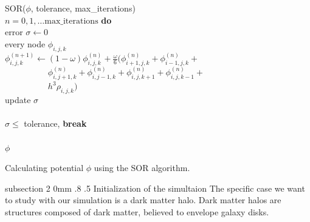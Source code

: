 \documentclass[notitlepage, 12pt]{article}
\makeatletter
\renewcommand{\subsection}{\@startsection    %
        {subsection}
        {2}
        {0mm}
        {.8\baselineskip}
        {.5\baselineskip}
        {\bfseries\normalsize}}
\makeatother
\begin{document}
\begin{algorithm}[H]
\hspace{0.1\textwidth}\parbox{.8\textwidth}{
\-\hspace{0ex}{\bf function} SOR($\phi$, tolerance, max\_iterations)\\
\-\hspace{4ex}{\bf for} $n = 0,1,\ldots\mbox{max\_iterations}$ {\bf do}\\
\-\hspace{8ex}error $\sigma\leftarrow 0$\\
\-\hspace{8ex}{\bf for} every node $\phi_{i,j,k}$\\
\-\hspace{12ex}$\phi_{i,j,k}^{(n+1)} \leftarrow (1-\omega)\phi_{i,j,k}^{(n)} + \frac{\omega}{6} (\phi_{i+1,j,k}^{(n)} +\phi_{i-1,j,k}^{(n)}+$\\
\-\hspace{12ex}$\phantom{\phi_{i,j,k}^{(n+1)} \leftarrow }\phi_{i,j+1,k}^{(n)}+ \phi_{i,j-1,k}^{(n)} + \phi_{i,j,k+1}^{(n)} + \phi_{i,j,k-1}^{(n)} +$\\
\-\hspace{12ex}$\phantom{\phi_{i,j,k}^{(n+1)} \leftarrow} h^3\rho_{i,j,k})$\\
\-\hspace{12ex}update $\sigma$\\
\-\hspace{8ex}{\bf end for}\\
\-\hspace{8ex}{\bf if} $\sigma \leq $ tolerance, {\bf break}\\
\-\hspace{4ex}{\bf end for}\\
\-\hspace{4ex}{\bf return} $\phi$\\
\-\hspace{0ex}{\bf end function}}
\caption{Calculating potential $\phi$ using the SOR algorithm.}
\label{alg:poissonsolver}
\end{algorithm}




\subsection{Initialization of the simultaion}
The specific case we want to study with our simulation is a dark matter halo. Dark matter halos are structures composed of dark matter, believed to envelope galaxy disks.
\end{document}
